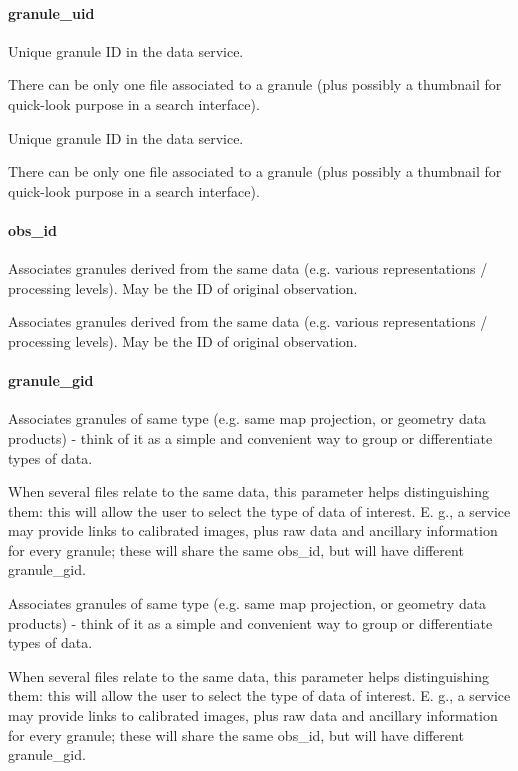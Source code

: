 \documentclass[11pt,a4paper]{ivoa}
\begin{document}
\paragraph{granule\_uid}

Unique granule ID in the data service.

There can be only one file associated to a granule (plus possibly a thumbnail for quick-look purpose in a search interface).

Unique granule ID in the data service.

There can be only one file associated to a granule (plus possibly a thumbnail for quick-look purpose in a search interface).

\paragraph{obs\_id}

Associates granules derived from the same data (e.g. various representations / processing levels). May be the ID of original observation.

Associates granules derived from the same data (e.g. various representations / processing levels). May be the ID of original observation.

\paragraph{granule\_gid}

Associates granules of same type (e.g. same map projection, or geometry data products) - think of it as a simple and convenient way to group or differentiate types of data.

When several files relate to the same data, this parameter helps distinguishing them: this will allow the user to select the type of data of interest. E. g., a service may provide links to calibrated images, plus raw data and ancillary information for every granule; these will share the same obs\_id, but will have different granule\_gid.

Associates granules of same type (e.g. same map projection, or geometry data products) - think of it as a simple and convenient way to group or differentiate types of data.

When several files relate to the same data, this parameter helps distinguishing them: this will allow the user to select the type of data of interest. E. g., a service may provide links to calibrated images, plus raw data and ancillary information for every granule; these will share the same obs\_id, but will have different granule\_gid.
\end{document}
